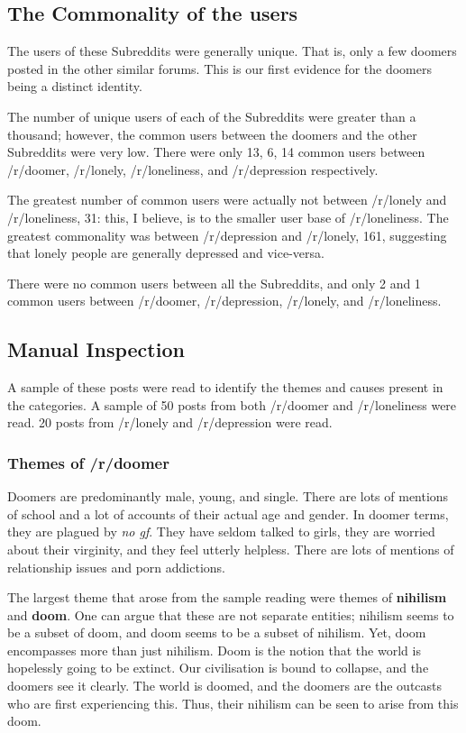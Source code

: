 \documentclass[../report.tex]{subfiles}
\begin{document}
\subsection{The Commonality of the users}
The users of these Subreddits were generally unique.
That is, only a few doomers posted in the other similar forums. 
This is our first evidence for the doomers being a distinct identity. 

The number of unique users of each of the Subreddits were greater than a thousand; however, the common users between the doomers and the other Subreddits were very low. 
There were only 13, 6, 14 common users between /r/doomer, /r/lonely, /r/loneliness, and /r/depression respectively. 

The greatest number of common users were actually not between /r/lonely and /r/loneliness, 31: this, I believe, is to the smaller user base of /r/loneliness. 
The greatest commonality was between /r/depression and /r/lonely, 161, suggesting that lonely people are generally depressed and vice-versa.

There were no common users between all the Subreddits, and only 2 and 1 common users between /r/doomer, /r/depression, /r/lonely, and /r/loneliness.

\subsection{Manual Inspection}
A sample of these posts were read to identify the themes and causes present in the categories.
A sample of 50 posts from both /r/doomer and /r/loneliness were read. 20 posts from /r/lonely and /r/depression were read. 

\subsubsection{Themes of /r/doomer}
Doomers are predominantly male, young, and single. 
There are lots of mentions of school and a lot of accounts of their actual age and gender. 
In doomer terms, they are plagued by \textit{no gf}. 
They have seldom talked to girls, they are worried about their virginity, and they feel utterly helpless. 
There are lots of mentions of relationship issues and porn addictions. 

The largest theme that arose from the sample reading were themes of \textbf{nihilism} and \textbf{doom}. 
One can argue that these are not separate entities; nihilism seems to be a subset of doom, and doom seems to be a subset of nihilism.
Yet, doom encompasses more than just nihilism.
Doom is the notion that the world is hopelessly going to be extinct. 
Our civilisation is bound to collapse, and the doomers see it clearly.
The world is doomed, and the doomers are the outcasts who are first experiencing this. 
Thus, their nihilism can be seen to arise from this doom. 
\end{document}
